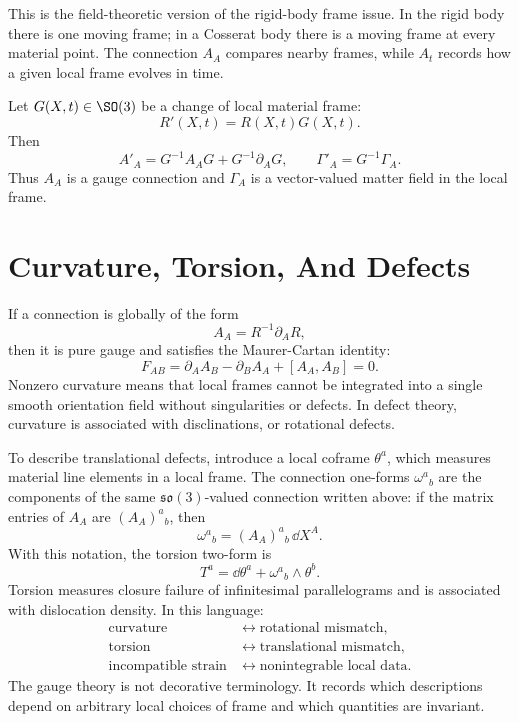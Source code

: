 This is the field-theoretic version of the rigid-body frame issue. In the
rigid body there is one moving frame; in a Cosserat body there is a moving frame
at every material point. The connection \(A_A\) compares nearby frames, while
\(A_t\) records how a given local frame evolves in time.

\begin{definition}
Let \(G(X,t)\in\SO(3)\) be a change of local material frame:
\[
  R'(X,t)=R(X,t)G(X,t).
\]
Then
\[
  A'_A=G^{-1}A_AG+G^{-1}\partial_A G,
  \qquad
  \Gamma'_A=G^{-1}\Gamma_A.
\]
Thus \(A_A\) is a gauge connection and \(\Gamma_A\) is a vector-valued
matter field in the local frame.
\end{definition}

\section{Curvature, Torsion, And Defects}
\label{sec:curvature-torsion-defects}

If a connection is globally of the form
\[
  A_A=R^{-1}\partial_A R,
\]
then it is pure gauge and satisfies the Maurer-Cartan identity:
\[
  F_{AB}
  =
  \partial_AA_B-\partial_BA_A+[A_A,A_B]
  =
  0.
\]
Nonzero curvature means that local frames cannot be integrated into a single
smooth orientation field without singularities or defects. In defect theory,
curvature is associated with disclinations, or rotational defects.

To describe translational defects, introduce a local coframe \(\theta^a\), which
measures material line elements in a local frame. The connection one-forms
\(\omega^a{}_b\) are the components of the same \(\mathfrak{so}(3)\)-valued
connection written above: if the matrix entries of \(A_A\) are
\((A_A)^a{}_b\), then
\[
  \omega^a{}_b=(A_A)^a{}_b\,\dd X^A.
\]
With this notation, the torsion two-form is
\[
  T^a=\dd\theta^a+\omega^a{}_b\wedge\theta^b.
\]
Torsion measures closure failure of infinitesimal parallelograms and is
associated with dislocation density. In this language:
\[
\begin{aligned}
  \text{curvature} &\longleftrightarrow \text{rotational mismatch},\\
  \text{torsion} &\longleftrightarrow \text{translational mismatch},\\
  \text{incompatible strain} &\longleftrightarrow \text{nonintegrable local data}.
\end{aligned}
\]
The gauge theory is not decorative terminology. It records which descriptions
depend on arbitrary local choices of frame and which quantities are invariant.

